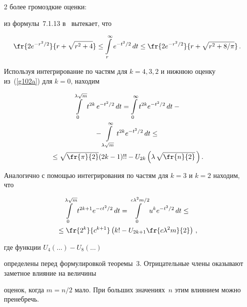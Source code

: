 \begin{multicols}{2}
более громоздкие оценки:


из формулы~7.1.13 в~\cite{8-cr}   вытекает, что


\begin{equation}


\fr{2e^{-r^2/2}}{r + \sqrt{r^2 + 4}} \leq \int\limits_r^{\infty} e^{-t^2/2}\,dt \leq 


\fr{2 e^{-r^2/2}}{r + \sqrt{r^2 + 8/\pi}}\,.


\label{g102a}


\end{equation}


Используя интегрирование по частям для   $k=4, 3, 2$  и нижнюю оценку из~(\ref{g102a}) для $k=0$, находим


\begin{multline*}


  \int\limits_0^{\lambda\sqrt{m}}t^{2k}\,e^{-t^2/2}\,dt =\int\limits_0^{\infty}t^{2k}e^{-t^2/2}\,dt - {}\\


  {}-


  \int\limits_{\lambda\sqrt{m}}^{\infty}t^{2k}e^{-t^2/2}\,dt \leq{}\\


{}\leq  \sqrt{\fr{\pi}{2}}(2k-1)!!-U_{2k}\left(\lambda\,\sqrt{\fr{n}{2}}\,\right).


\end{multline*}


Аналогично с помощью интегрирования по частям для   $k=3$  и $k=2$ находим, что


\begin{multline*}


\int\limits_0^{\lambda\sqrt{m}} t^{2k+1}e^{-ct^2/2}\,dt =


\int\limits_0^{c\lambda^2 m/2}u^k e^{-t^2/2}\,dt\leq{}\\


{}\leq\fr{2^k}{c^{k+1}}\left(k! - U_{2k+1}\fr{c\lambda^2m}{2}\right)\,,


\end{multline*}


где функции   $U_4(\ldots)- U_8(\ldots)$ 


определены перед формулировкой теоремы~3. Отрицательные члены оказывают заметное влияние на величины 


оценок, когда   $m = n/2 $ мало. При больших значениях~$n$ этим влиянием можно пренебречь.  






\end{multicols}
